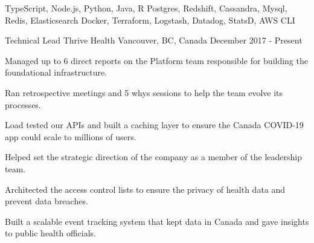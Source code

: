 \begin{cvskills}
   {TypeScript, Node.js, Python, Java, R}
   {Postgres, Redshift, Cassandra, Mysql, Redis, Elasticsearch}
   {Docker, Terraform, Logstash, Datadog, StatsD, AWS CLI}
\end{cvskills}




\begin{cventries}

  \cventry
    {Technical Lead} %
    {Thrive Health} %
    {Vancouver, BC, Canada} %
    {December 2017 - Present} %
    {
      \begin{cvitems} %
        \item {Managed up to 6 direct reports on the Platform team responsible for building the foundational infrastructure.}
        \item {Ran retrospective meetings and 5 whys sessions to help the team evolve its processes.}
        \item {Load tested our APIs and built a caching layer to ensure the Canada COVID-19 app could scale to millions of users.}
        \item {Helped set the strategic direction of the company as a member of the leadership team.}
        \item {Architected the access control lists to ensure the privacy of health data and prevent data breaches.}
        \item {Built a scalable event tracking system that kept data in Canada and gave insights to public health officials.}
      \end{cvitems}
    }



\end{cventries}
